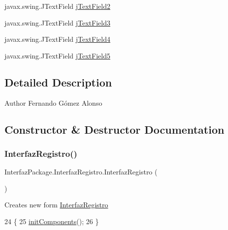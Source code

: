 \begin{DoxyCompactItemize}
\item 
javax.\+swing.\+J\+Text\+Field \mbox{\hyperlink{class_interfaz_package_1_1_interfaz_registro_a999435bfad451715c3e32330d21be7bb}{j\+Text\+Field2}}
\item 
javax.\+swing.\+J\+Text\+Field \mbox{\hyperlink{class_interfaz_package_1_1_interfaz_registro_a053413f2ec138bbb7914f22521b998f2}{j\+Text\+Field3}}
\item 
javax.\+swing.\+J\+Text\+Field \mbox{\hyperlink{class_interfaz_package_1_1_interfaz_registro_ac390d7bd629d29d59202c8b4fd60f46c}{j\+Text\+Field4}}
\item 
javax.\+swing.\+J\+Text\+Field \mbox{\hyperlink{class_interfaz_package_1_1_interfaz_registro_ad0d4eb99969584d92b6b857ad190d210}{j\+Text\+Field5}}
\end{DoxyCompactItemize}


\subsection{Detailed Description}
\begin{DoxyAuthor}{Author}
Fernando Gómez Alonso 
\end{DoxyAuthor}


\subsection{Constructor \& Destructor Documentation}
\mbox{\label{class_interfaz_package_1_1_interfaz_registro_af44bbc6e1ad688d95cff640e7ce5a387}} 
\subsubsection{\texorpdfstring{Interfaz\+Registro()}{InterfazRegistro()}}
{\footnotesize\ttfamily Interfaz\+Package.\+Interfaz\+Registro.\+Interfaz\+Registro (\begin{DoxyParamCaption}{ }\end{DoxyParamCaption})\hspace{0.3cm}{\ttfamily [inline]}}

Creates new form \mbox{\hyperlink{class_interfaz_package_1_1_interfaz_registro}{Interfaz\+Registro}} 
\begin{DoxyCode}
24                               \{
25         \mbox{\hyperlink{class_interfaz_package_1_1_interfaz_registro_ac2213b3d60f5dbe3b48030b85807c1ac}{initComponents}}();
26     \}
\end{DoxyCode}


